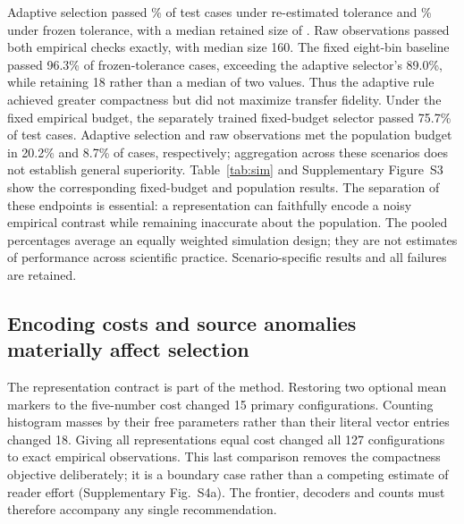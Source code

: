 \documentclass[11pt]{article}
\begin{document}
Adaptive selection passed \ReestimatedPass\% of test cases under re-estimated tolerance and \FrozenPass\% under frozen tolerance, with a median retained size of \MedianN. Raw observations passed both empirical checks exactly, with median size 160. The fixed eight-bin baseline passed 96.3\% of frozen-tolerance cases, exceeding the adaptive selector's 89.0\%, while retaining 18 rather than a median of two values. Thus the adaptive rule achieved greater compactness but did not maximize transfer fidelity. Under the fixed empirical budget, the separately trained fixed-budget selector passed 75.7\% of test cases. Adaptive selection and raw observations met the population budget in 20.2\% and 8.7\% of cases, respectively; aggregation across these scenarios does not establish general superiority. Table~\ref{tab:sim} and Supplementary Figure~S3 show the corresponding fixed-budget and population results. The separation of these endpoints is essential: a representation can faithfully encode a noisy empirical contrast while remaining inaccurate about the population. The pooled percentages average an equally weighted simulation design; they are not estimates of performance across scientific practice. Scenario-specific results and all failures are retained.

\begin{table}[ht]\centering\small
\caption{\textbf{Performance depends on what must be preserved.} Percentages over 1,080 test samples per method. Re-estimated and frozen columns evaluate empirical reconstruction using test and training adaptive tolerances, respectively. Fixed empirical and population columns use $0.2s_{\mathrm{population}}$. Only the fixed-budget selector is selected under that fixed budget. Population error is a grid approximation.}\label{tab:sim}

\end{table}



\subsection*{Encoding costs and source anomalies materially affect selection}
The representation contract is part of the method. Restoring two optional mean markers to the five-number cost changed 15 primary configurations. Counting histogram masses by their free parameters rather than their literal vector entries changed 18. Giving all representations equal cost changed all 127 configurations to exact empirical observations. This last comparison removes the compactness objective deliberately; it is a boundary case rather than a competing estimate of reader effort (Supplementary Fig.~S4a). The frontier, decoders and counts must therefore accompany any single recommendation.
\end{document}
